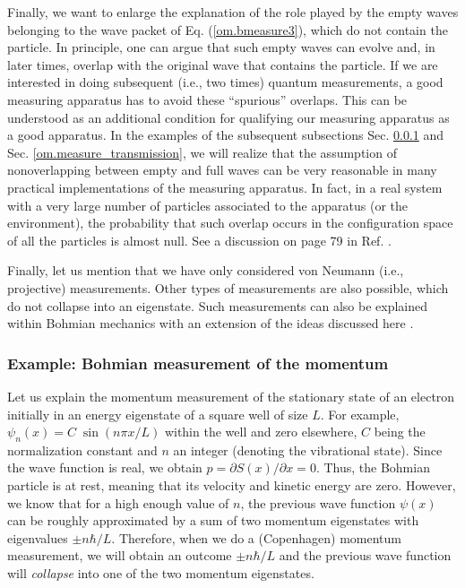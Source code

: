 \documentclass[onecolumn,nofootinbib, secnumarabic, amsmath, nobibnotes,12pt,aps,pra]{revtex4-1}
\newcommand{\sref}[1]{Sec. \ref{#1}}
\newcommand{\eref}[1]{Eq. (\ref{#1})}
\begin{document}
Finally, we want to enlarge the explanation of the role played by the empty waves belonging to the wave packet of \eref{om.bmeasure3}, which do not contain the particle. In principle, one can argue that such empty waves can evolve and, in later times, overlap with the original wave that contains the particle. If we are interested in doing subsequent (i.e., two times) quantum measurements, a good measuring apparatus has to avoid these ``spurious'' overlaps. This can be understood as an additional condition for qualifying our measuring apparatus as a good apparatus. In the examples of the subsequent subsections \sref{om.measure_moment} and \sref{om.measure_transmission}, we will realize that the assumption of nonoverlapping between empty and full waves can be very reasonable in many practical implementations of the measuring apparatus. In fact, in a real system with a very large number of particles associated to the apparatus (or the environment), the probability that such overlap occurs in the configuration space of all the particles is almost null. See a discussion on page 79 in Ref. \cite{om.bomhhiley1993}.

Finally, let us mention that we have only considered von Neumann
(i.e., projective) measurements. Other types of measurements are
also possible, which do not collapse into an eigenstate. Such
measurements can also be explained within Bohmian mechanics with an
extension of the ideas discussed here
\cite{om.bomhhiley1993,om.Durrnaive,om.Durrllibre}.

\subsubsection{Example: Bohmian measurement of the momentum}
\label{om.measure_moment}

Let us explain the momentum measurement of the stationary state of
an electron initially in an energy eigenstate of a square well of
size $L$. For example, $\psi_n(x) = C \; \sin(n \pi x/L)$ within the
well and zero elsewhere, $C$ being the normalization constant and
$n$ an integer (denoting the vibrational state). Since the wave
function is real, we obtain $p = \partial S(x)/\partial x = 0$.
Thus, the Bohmian particle is at rest, meaning that its velocity and
kinetic energy are zero. However, we know that for a high enough
value of $n$, the previous wave function $\psi(x)$ can be roughly
approximated by a sum of two momentum eigenstates with eigenvalues
$\pm n \hbar/L$. Therefore, when we do a (Copenhagen) momentum
measurement, we will obtain an outcome $\pm n \hbar/L$ and the
previous wave function will \textit{collapse} into one of the two
momentum eigenstates.
\end{document}
